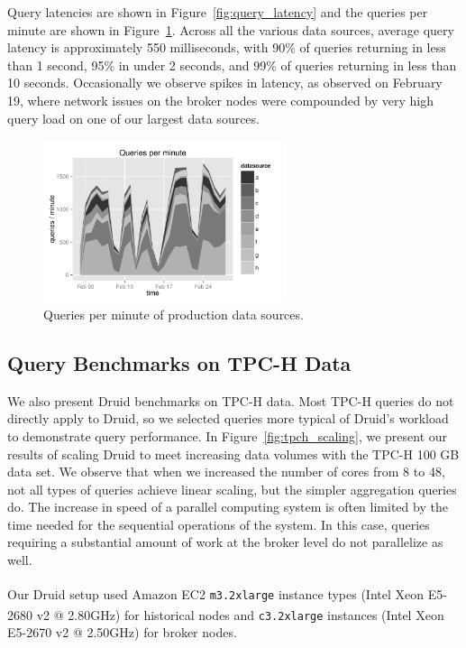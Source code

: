 \documentclass{vldb}
\begin{document}
Query latencies are shown in Figure~\ref{fig:query_latency} and the queries per
minute are shown in Figure~\ref{fig:queries_per_min}. Across all the various
data sources, average query latency is approximately 550 milliseconds, with
90\% of queries returning in less than 1 second, 95\% in under 2 seconds, and
99\% of queries returning in less than 10 seconds. Occasionally we observe
spikes in latency, as observed on February 19, where network issues on
the broker nodes were compounded by very high query load on one of our
largest data sources.

\begin{figure}
\centering
\includegraphics[width = 2.8in]{queries_per_min}
\caption{Queries per minute of production data sources.}
\label{fig:queries_per_min}
\end{figure}

\subsection{Query Benchmarks on TPC-H Data}
We also present Druid benchmarks on TPC-H data.  Most TPC-H queries do not
directly apply to Druid, so we selected queries more typical of Druid's
workload to demonstrate query performance. In Figure~\ref{fig:tpch_scaling}, we
present our results of scaling Druid to meet increasing data volumes with the
TPC-H 100 GB data set. We observe that when we increased the number of cores
from 8 to 48, not all types of queries achieve linear scaling, but the simpler
aggregation queries do. The increase in speed of a parallel computing system is
often limited by the time needed for the sequential operations of the system.
In this case, queries requiring a substantial amount of work at the broker
level do not parallelize as well.

Our Druid setup used Amazon EC2 \texttt{m3.2xlarge} instance types
(Intel\textsuperscript{\textregistered} Xeon\textsuperscript{\textregistered}
E5-2680 v2 @ 2.80GHz) for historical nodes and \texttt{c3.2xlarge} instances
(Intel\textsuperscript{\textregistered} Xeon\textsuperscript{\textregistered}
E5-2670 v2 @ 2.50GHz) for broker nodes. 
\end{document}
